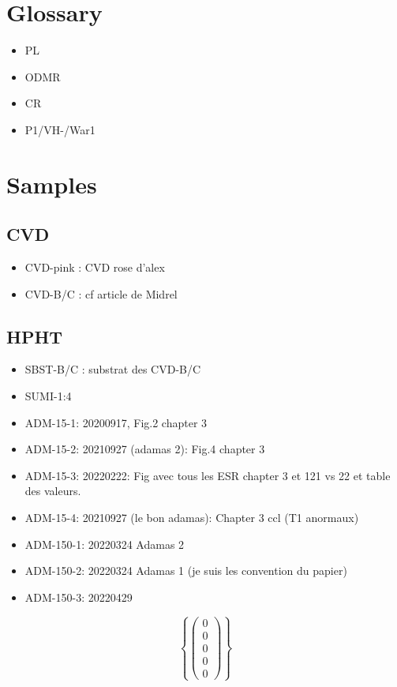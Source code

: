 \documentclass[a4paper]{article}
\begin{document}
\section{Glossary}
\begin{itemize}
\item PL
\item ODMR
\item CR
\item P1/VH-/War1
\end{itemize}
\section{Samples}
\subsection{CVD}
\begin{itemize}
\item CVD-pink : CVD rose d'alex
\item CVD-B/C : cf article de Midrel
\end{itemize}
\subsection{HPHT}
\begin{itemize}
\item SBST-B/C : substrat des CVD-B/C
\item SUMI-1:4
\item ADM-15-1: 20200917, Fig.2 chapter 3
\item ADM-15-2: 20210927 (adamas 2): Fig.4 chapter 3
\item ADM-15-3: 20220222: Fig avec tous les ESR chapter 3 et 121 vs 22 et table des valeurs.
\item ADM-15-4: 20210927 (le bon adamas): Chapter 3 ccl (T1 anormaux)
\item ADM-150-1: 20220324 Adamas 2
\item ADM-150-2: 20220324 Adamas 1 (je suis les convention du papier)
\item ADM-150-3: 20220429
\end{itemize}
\begin{equation}
\left\{
\begin{pmatrix}
0\\
0\\
0\\
0\\
0
\end{pmatrix}
\right\}
\end{equation}
\end{document}
